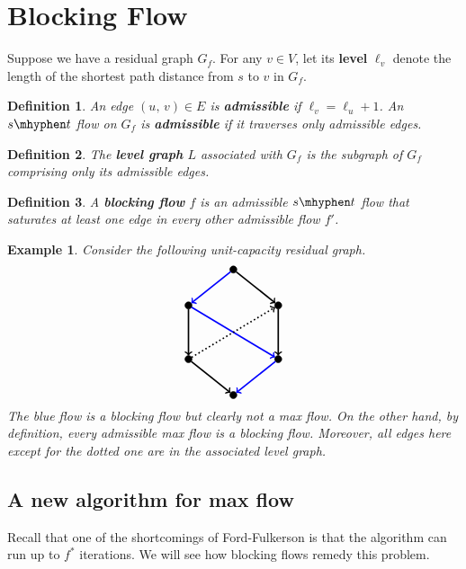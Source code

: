 \documentclass[11pt]{article}
\newtheorem*{example}{Example}
\newtheorem*{definition}{Definition}
\begin{document}
\section{Blocking Flow}
Suppose we have a residual graph $G_f$. For any $v\in V$, let its \textbf{level} $\ell_v$ denote the length of the shortest path distance from $s$ to $v$ in $G_f$.

\begin{definition}
An edge $(u,\, v)\in E$ is \textbf{admissible} if $\ell_v=\ell_u+1$. An $s\mhyphen t$ flow on $G_f$ is \textbf{admissible} if it traverses only admissible edges.
\end{definition}
\begin{definition}
The \textbf{level graph} $L$ associated with $G_f$ is the subgraph of $G_f$ comprising only its admissible edges.
\end{definition}
\begin{definition}
A \textbf{blocking flow} $f$ is an admissible $s\mhyphen t$ flow that saturates at least one edge in every other admissible flow $f'$.
\end{definition}

\begin{example}
Consider the following unit-capacity residual graph. 
$$\begin{tikzpicture}[every node/.style={draw,shape=circle,inner sep=2pt,outer sep=0pt, fill=black}]
\path (0,0) node (p0) {}
(-1.25,-1) node (p1) {}
(-1.25,-2.5) node (p2) {}
(1.25,-2.5) node (p3) {}
(1.25,-1) node (p4) {}
(0,-3.5) node (p5) { };
\draw[->,blue, very thick](p0)--(p1);
\draw[->, very thick](p1)--(p2);
\draw[->, very thick](p0)--(p4);
\draw[->, very thick](p4)--(p3);
\draw[->, very thick](p2)--(p5);
\draw[->, blue, very thick](p3)--(p5);
\draw[->, blue, very thick](p1)--(p3);
\draw[->, dotted, very thick](p2)--(p4);
\end{tikzpicture}$$
The blue flow is a blocking flow but clearly not a max flow. On the other hand, by definition, every admissible max flow is a blocking flow. Moreover, all edges here except for the dotted one are in the associated level graph.
\end{example}

\subsection{A new algorithm for max flow}
Recall that one of the shortcomings of Ford-Fulkerson is that the algorithm can run up to $f^*$ iterations. We will see how blocking flows remedy this problem.
\end{document}
